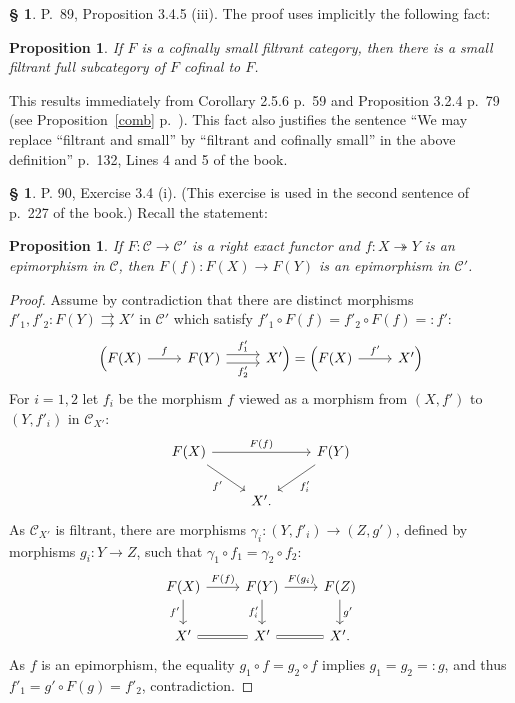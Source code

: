 \documentclass[12pt]{article}%
\newtheorem{prop}[thm]{Proposition}
\theoremstyle{remark}
\theoremstyle{definition}
\newtheorem{s}[thm]{\S}%
\newcommand{\C}{\mathcal C}
\newcommand{\epi}{\twoheadrightarrow}
\begin{document}
\begin{s} 
P.~89, Proposition 3.4.5 (iii). The proof uses implicitly the following fact: 

\begin{prop}\label{355}
If $F$ is a cofinally small filtrant category, then there is a small {\em filtrant} full subcategory of $F$ cofinal to $F$. 
\end{prop}

This results immediately from Corollary 2.5.6 p.~59 and Proposition 3.2.4 p.~79 (see Proposition~\ref{comb} p.~\pageref{comb}). This fact also justifies the sentence ``We may replace ``filtrant and small'' by ``filtrant and cofinally small'' in the above definition'' p.~132, Lines 4 and 5 of the book.
\end{s}
%
%
\begin{s} 
P. 90, Exercise 3.4 (i). (This exercise is used in the second sentence of p.~227 of the book.) Recall the statement: 
%
\begin{prop}\label{34i}
If $F:\C\to\C'$ is a right exact functor and $f:X\epi Y$ is an epimorphism in $\C$, then $F(f):F(X)\to F(Y)$ is an epimorphism in $\C'$.
\end{prop}
%
\begin{proof}
Assume by contradiction that there are distinct morphisms $f'_1,f'_2:F(Y)\rightrightarrows X'$ in $\C'$ which satisfy $f'_1\circ F(f)=f'_2\circ F(f)=:f'$:
$$
\begin{tikzcd}
\Big(F(X)\ar{r}{f}&F(Y)\ar[yshift=.7ex]{r}{f'_1}\ar[yshift=-.7ex]{r}[swap]{f'_2}&X'\Big)=\Big(F(X)\ar{r}{f'}&X'\Big)
\end{tikzcd}
$$ 
For $i=1,2$ let $f_i$ be the morphism $f$ viewed as a morphism from $(X,f')$ to $(Y,f'_i)$ in $\C_{X'}$: 
$$
\begin{tikzcd}
F(X)\ar{dr}[swap]{f'}\ar{rr}{F(f)}&&F(Y)\ar{dl}{f'_i}\\ 
{}&X'.
\end{tikzcd}
$$
As $\C_{X'}$ is filtrant, there are morphisms $\gamma_i:(Y,f'_i)\to(Z,g')$, defined by morphisms $g_i:Y\to Z$, such that $\gamma_1\circ f_1=\gamma_2\circ f_2$:
$$
\begin{tikzcd}
F(X)\ar{d}[swap]{f'}\ar{r}{F(f)}&F(Y)\ar{d}[swap]{f'_i}\ar{r}{F(g_i)}&F(Z)\ar{d}{g'}\\ 
X'\ar[equal]{r}&X'\ar[equal]{r}&X'.
\end{tikzcd}
$$
As $f$ is an epimorphism, the equality $g_1\circ f=g_2\circ f$ implies $g_1=g_2=:g$, and thus $f'_1=g'\circ F(g)=f'_2$, contradiction.
\end{proof}
\end{s}
\end{document}
